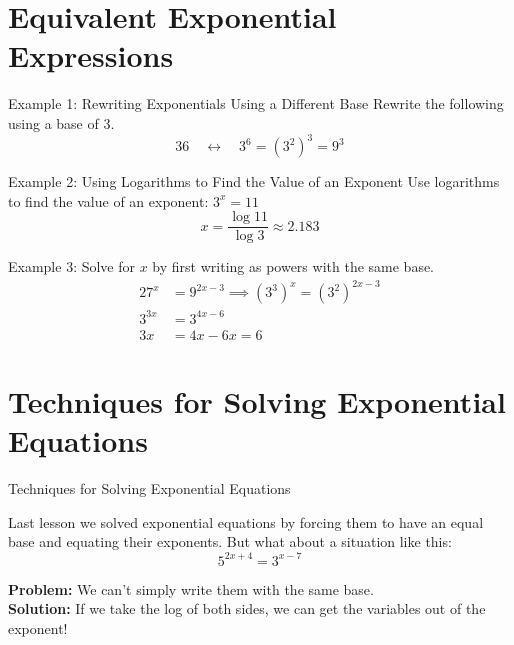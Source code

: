 \documentclass{article}
\begin{document}
\section{Equivalent Exponential Expressions}

\begin{examplebox}{Example 1: Rewriting Exponentials Using a Different Base}
Rewrite the following using a base of 3.
\[
36 \quad \leftrightarrow \quad 3^6 = (3^2)^3 = 9^3
\]
\end{examplebox}

\begin{examplebox}{Example 2: Using Logarithms to Find the Value of an Exponent}
Use logarithms to find the value of an exponent: \( 3^x = 11 \)
\[
x = \frac{\log{11}}{\log{3}} \approx 2.183
\]
\end{examplebox}
\begin{examplebox}{Example 3: Solve for \( x \) by first writing as powers with the same base.}
\begin{align*}
    27^x &= 9^{2x-3} \implies (3^3)^x = (3^2)^{2x-3} \\ 
    3^{3x} &= 3^{4x-6}  \\
    3x &= 4x-6 x = 6
\end{align*}
\end{examplebox}
\section{Techniques for Solving Exponential Equations}
\begin{lessonbox}{Techniques for Solving Exponential Equations}


Last lesson we solved exponential equations by forcing them to have an equal base and equating their exponents. But what about a situation like this:
\[
5^{2x+4} = 3^{x-7}
\]
\end{lessonbox}

\noindent \textbf{Problem:} We can't simply write them with the same base.\\
\textbf{Solution:} If we take the log of both sides, we can get the variables out of the exponent!
\end{document}
